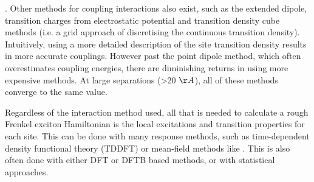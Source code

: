 . Other methods for coupling interactions also exist, such as the extended dipole,
transition charges from electrostatic potential and transition density cube methods
(i.e. a grid approach of discretising the continuous transition density). Intuitively,
using a more detailed description of the site transition density results in more 
accurate couplings. However past the point dipole method, which often overestimates
coupling energies, there are diminishing returns in using more expensive methods.
At large separations (>20 $\AA{}$), all of these methods converge to the same value.

Regardless of the interaction method used, all that is needed to calculate a rough
Frenkel exciton Hamiltonian is the local excitations and transition properties for 
each site. This can be done with many response methods, such as time-dependent density
functional theory (TDDFT) or mean-field methods like \dscf. This is also often done
with either DFT or DFTB based methods, or with statistical approaches. 
 
